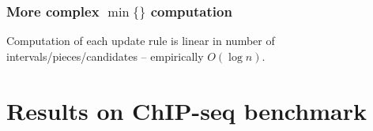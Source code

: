 \documentclass{beamer}
\begin{document}
\begin{frame}
  \frametitle{More complex $\min\{\}$ computation}
  Computation of each update rule is linear in number of
  intervals/pieces/candidates -- empirically $O(\log n)$.
  \begin{minipage}[t]{\linewidth}
  \hskip -1cm
   
  \end{minipage}
\end{frame}








\section{Results on ChIP-seq benchmark}
\end{document}
